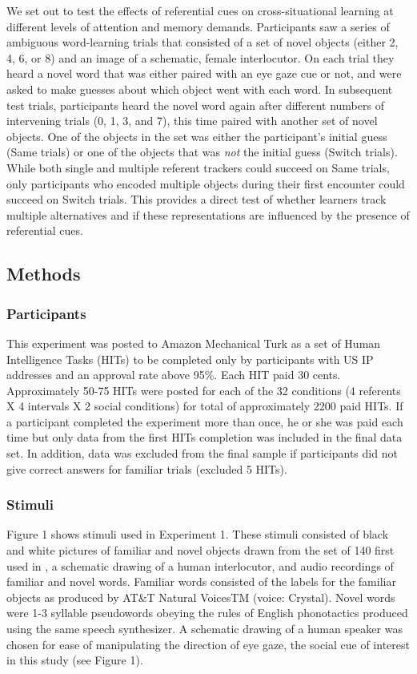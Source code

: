 \documentclass[10pt,letterpaper]{article}
\begin{document}
We set out to test the effects of referential cues on cross-situational learning at different levels of attention and memory demands. Participants saw a series of ambiguous word-learning trials that consisted of a set of novel objects (either 2, 4, 6, or 8) and an image of a schematic, female interlocutor. On each trial they heard a novel word that was either paired with an eye gaze cue or not, and were asked to make guesses about which object went with each word. In subsequent test trials, participants heard the novel word again after different numbers of intervening trials (0, 1, 3, and 7), this time paired with another set of novel objects. One of the objects in the set was either the participant's initial guess (Same trials) or one of the objects that was \emph{not} the initial guess (Switch trials). While both single and multiple referent trackers could succeed on Same trials, only participants who encoded multiple objects during their first encounter could succeed on Switch trials. This provides a direct test of whether learners track multiple alternatives and if these representations are influenced by the presence of referential cues. 

\subsection{Methods}

\subsubsection{Participants}

This experiment was posted to Amazon Mechanical Turk as a set of
Human Intelligence Tasks (HITs) to be completed only by participants with US IP
addresses and an approval rate above 95\%. Each HIT paid 30 cents. Approximately 50-75 HITs were posted for each of the 32 conditions (4 referents X 4 intervals X 2 social conditions) for total of approximately 2200 paid HITs. If a participant completed the experiment more than once, he or she was paid each time but only data
from the first HITs completion was included in the final data set. In
addition, data was excluded from the final sample if participants did not give correct
answers for familiar trials (excluded 5 HITs).

\subsubsection{Stimuli}
Figure 1 shows stimuli used in Experiment 1. These stimuli consisted of black and white pictures of familiar
and novel objects drawn from the set of 140 first used in , a schematic drawing of a human interlocutor, and audio recordings of familiar and novel words. 
Familiar words consisted of the labels for the familiar objects as produced by AT\&T Natural VoicesTM (voice: Crystal). Novel words were 1-3 syllable pseudowords obeying the rules of English phonotactics produced using the same speech synthesizer. 
A schematic drawing of a human speaker was chosen for ease of manipulating the direction of eye gaze, the social cue of interest in this study (see Figure 1). 
\end{document}
